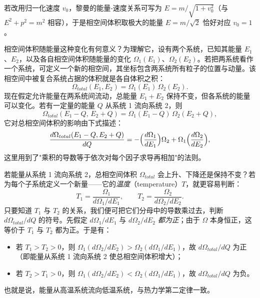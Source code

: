 若改用归一化速度 $v_0$，黎曼的能量-速度关系可写为 $E=m/\sqrt{1+v_0^{2}}$（与 $E^{2}+p^{2}=m^{2}$ 相容），于是相空间体积取极大的能量 $E=m/\sqrt2$ 恰好对应 $v_0=1$。

相空间体积随能量这种变化有何意义？为理解它，设有两个系统，已知其能量 $E_{1}$、$E_{2}$，以及各自相空间体积随能量的变化 $\Omega_{1}(E_{1})$、$\Omega_{2}(E_{2})$。若把两系统看作一个系统，可定义一个新的相空间，其坐标包含两系统所有粒子的位置与动量。该相空间中被复合系统占据的体积就是各自体积之积：
\begin{equation}
\Omega_{total}(E_{1},E_{2})=\Omega_{1}(E_{1})\,\Omega_{2}(E_{2}).
\end{equation}
现在假定允许能量在两系统间流动，总能量 $E_{1}+E_{2}$ 保持不变，但各系统的能量可以变化。若有一定量的能量 $Q$ 从系统 1 流向系统 2，则
\begin{equation}
\Omega_{total}(E_{1}-Q,\,E_{2}+Q)=\Omega_{1}(E_{1}-Q)\,\Omega_{2}(E_{2}+Q),
\end{equation}
它对总相空间体积的影响由下式描述：
\begin{equation}
\frac{d\Omega_{total}(E_{1}-Q,E_{2}+Q)}{dQ}
=-\Bigl(\frac{d\Omega_{1}}{dE_{1}}\Bigr)\Omega_{2}+\Omega_{1}\Bigl(\frac{d\Omega_{2}}{dE_{2}}\Bigr),
\end{equation}
这里用到了"乘积的导数等于依次对每个因子求导再相加"的法则。

若能量从系统 1 流向系统 2，总相空间体积 $\Omega_{total}$ 会上升、下降还是保持不变？若为每个子系统定义一个新量——它的\emph{温度}（temperature）$T$，就更容易判断：
\begin{equation}
T_{1}=\frac{\Omega_{1}}{d\Omega_{1}/dE_{1}},\qquad
T_{2}=\frac{\Omega_{2}}{d\Omega_{2}/dE_{2}}.
\end{equation}
只要知道 $T_{1}$ 与 $T_{2}$ 的关系，我们便可把它们分母中的导数乘过去，判断 $d\Omega_{total}/dQ$ 的符号。先假定 $d\Omega_{1}/dE_{1}$ 与 $d\Omega_{2}/dE_{2}$ \emph{都为正}；由于 $\Omega$ 本身恒正，这等价于 $T_{1}$ 与 $T_{2}$ 都为正。于是有：

\begin{itemize}
  \item 若 $T_{1}>T_{2}>0$，则 $\Omega_{1}(d\Omega_{2}/dE_{2})>\Omega_{2}(d\Omega_{1}/dE_{1})$，故 $d\Omega_{total}/dQ$ 为正（即能量从系统 1 流向系统 2 使总相空间体积增大）；
  \item 若 $T_{2}>T_{1}>0$，则 $\Omega_{1}(d\Omega_{2}/dE_{2})<\Omega_{2}(d\Omega_{1}/dE_{1})$，故 $d\Omega_{total}/dQ$ 为负。
\end{itemize}

也就是说，能量从高温系统流向低温系统，与热力学第二定律一致。

